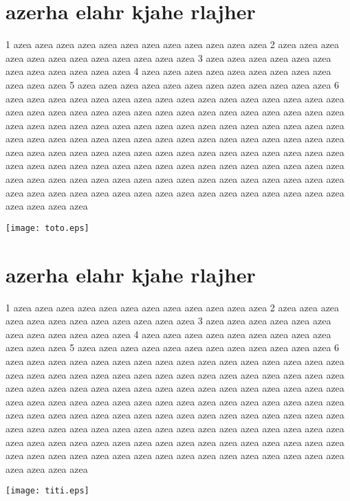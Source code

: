 \documentclass[a4paper]{article}
\begin{document}
\section{azerha elahr kjahe rlajher }
1 azea azea azea azea azea azea azea azea azea azea azea azea
2 azea azea azea azea azea azea azea azea azea azea azea azea
3 azea azea azea azea azea azea azea azea azea azea azea azea
4 azea azea azea azea azea azea azea azea azea azea azea azea
5 azea azea azea azea azea azea azea azea azea azea azea azea
6 azea azea azea azea azea azea azea azea azea azea azea azea
azea azea azea azea azea azea azea azea azea azea azea azea
azea azea azea azea azea azea azea azea azea azea azea azea
azea azea azea azea azea azea azea azea azea azea azea azea
azea azea azea azea azea azea azea azea azea azea azea azea
azea azea azea azea azea azea azea azea azea azea azea azea
azea azea azea azea azea azea azea azea azea azea azea azea
azea azea azea azea azea azea azea azea azea azea azea azea
azea azea azea azea azea azea azea azea azea azea azea azea
azea azea azea azea azea azea azea azea azea azea azea azea
azea azea azea azea azea azea azea azea azea azea azea azea

\texttt{[image: toto.eps]}

\section{azerha elahr kjahe rlajher }
1 azea azea azea azea azea azea azea azea azea azea azea azea
2 azea azea azea azea azea azea azea azea azea azea azea azea
3 azea azea azea azea azea azea azea azea azea azea azea azea
4 azea azea azea azea azea azea azea azea azea azea azea azea
5 azea azea azea azea azea azea azea azea azea azea azea azea
6 azea azea azea azea azea azea azea azea azea azea azea azea
azea azea azea azea azea azea azea azea azea azea azea azea
azea azea azea azea azea azea azea azea azea azea azea azea
azea azea azea azea azea azea azea azea azea azea azea azea
azea azea azea azea azea azea azea azea azea azea azea azea
azea azea azea azea azea azea azea azea azea azea azea azea
azea azea azea azea azea azea azea azea azea azea azea azea
azea azea azea azea azea azea azea azea azea azea azea azea
azea azea azea azea azea azea azea azea azea azea azea azea
azea azea azea azea azea azea azea azea azea azea azea azea
azea azea azea azea azea azea azea azea azea azea azea azea

\texttt{[image: titi.eps]}
\end{document}
